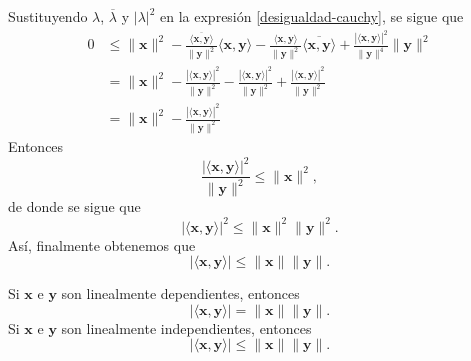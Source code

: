 \begin{theorem}
    Sustituyendo $\lambda$, $\overline{\lambda}$ y $|\lambda|^2$ en la expresión \eqref{desigualdad-cauchy}, se sigue que
    \begin{align*}
        0 & \leq \| \mathbf{x} \|^2 - \frac{\overline{\langle \mathbf{x}, \mathbf{y} \rangle}}{\| \mathbf{y} \|^2} \langle \mathbf{x}, \mathbf{y} \rangle - \frac{\langle \mathbf{x}, \mathbf{y} \rangle}{\| \mathbf{y} \|^2} \overline{\langle \mathbf{x}, \mathbf{y} \rangle} + \frac{|\langle \mathbf{x}, \mathbf{y} \rangle|^2}{\| \mathbf{y} \|^4} \| \mathbf{y} \|^2 \\
        & = \| \mathbf{x} \|^2 - \frac{|\langle \mathbf{x}, \mathbf{y} \rangle|^2}{\| \mathbf{y} \|^2} - \frac{|\langle \mathbf{x}, \mathbf{y} \rangle|^2}{\| \mathbf{y} \|^2} + \frac{|\langle \mathbf{x}, \mathbf{y} \rangle|^2}{\| \mathbf{y} \|^2} \\
        & = \| \mathbf{x} \|^2 - \frac{|\langle \mathbf{x}, \mathbf{y} \rangle|^2}{\| \mathbf{y} \|^2}
    \end{align*}
    Entonces
    $$\frac{|\langle \mathbf{x}, \mathbf{y} \rangle|^2}{\| \mathbf{y} \|^2} \leq \| \mathbf{x} \|^2,$$
    de donde se sigue que
    $$|\langle \mathbf{x}, \mathbf{y} \rangle|^2 \leq \| \mathbf{x} \|^2 \| \mathbf{y} \|^2.$$\newpage\noindent
    Así, finalmente obtenemos que
    $$|\langle \mathbf{x}, \mathbf{y} \rangle| \leq \| \mathbf{x} \| \| \mathbf{y} \|.$$
\end{theorem}

\begin{observation}
    Si $\mathbf{x}$ e $\mathbf{y}$ son linealmente dependientes, entonces
    $$|\langle \mathbf{x}, \mathbf{y} \rangle| = \| \mathbf{x} \| \| \mathbf{y} \|.$$
    Si $\mathbf{x}$ e $\mathbf{y}$ son linealmente independientes, entonces
    $$|\langle \mathbf{x}, \mathbf{y} \rangle| \leq \| \mathbf{x} \| \| \mathbf{y} \|.$$
\end{observation}

